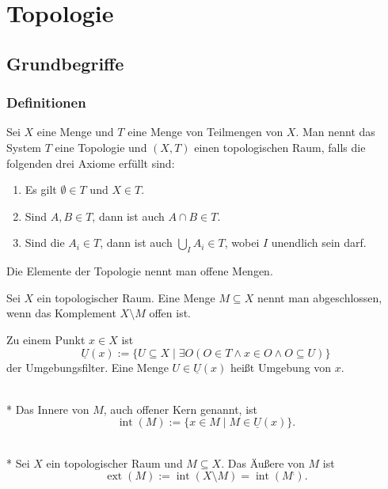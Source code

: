 
\chapter{Topologie}
\section{Grundbegriffe}
\subsection{Definitionen}

\begin{Definition}
Sei $X$ eine Menge und $T$ eine Menge von Teilmengen von $X$.
Man nennt das System $T$ eine Topologie und $(X,T)$ einen topologischen
Raum, falls die folgenden drei Axiome erfüllt sind:
\begin{enumerate}
\item Es gilt $\emptyset\in T$ und $X\in T$.
\item Sind $A,B\in T$, dann ist auch $A\cap B\in T$.
\item Sind die $A_i\in T$, dann ist auch $\bigcup_I A_i\in T$, wobei $I$ unendlich sein darf.
\end{enumerate}
Die Elemente der Topologie nennt man offene Mengen.
\end{Definition}

\begin{Definition}
Sei $X$ ein topologischer Raum. Eine Menge $M\subseteq X$
nennt man abgeschlossen, wenn das Komplement $X\setminus M$ offen ist.
\end{Definition}

\begin{Definition}%
\label{def:nh-filter}
Zu einem Punkt $x\in X$ ist
\[\underline U(x) := \{U{\subseteq}X\mid
\exists O(O\in T\land x\in O\land O\subseteq U)\}\]
der Umgebungsfilter. Eine Menge $U\in\underline U(x)$ heißt
Umgebung von $x$.
\end{Definition}

\begin{Definition}\mbox{}\\*
\label{def:int}%
Das Innere von $M$, auch offener Kern genannt, ist
\[\operatorname{int}(M) := \{x\in M\mid M\in \underline U(x)\}.\]
\end{Definition}

\begin{Definition}\mbox{}\\*
Sei $X$ ein topologischer Raum und $M\subseteq X$. Das Äußere von $M$ ist
\[\operatorname{ext}(M) := \operatorname{int}(X\setminus M) = \operatorname{int}(M^\comp).\]
\end{Definition}

